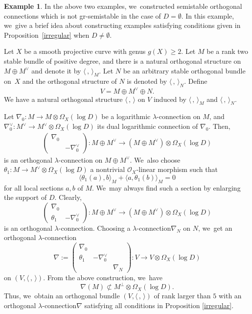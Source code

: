 \documentclass[11pt]{article}
\numberwithin{equation}{section}
\newcommand{\lconnection}{$\lambda$\nobreakdash-con\-nec\-tion\xspace}
\newcommand{\grsemistable}{gr\nobreakdash-semi\-stable\xspace}
\theoremstyle{plain}
\theoremstyle{definition}
\newtheorem{examp}[thm]{Example}
\begin{document}
\begin{examp}\label{exmp_idea}
In the above two examples, we~constructed semistable orthogonal connections which is not \grsemistable in the case of $D=\emptyset$. In this example, we~give a brief idea about constructing examples satisfying conditions given in Proposition~\ref{irregular} when $D\neq\emptyset$.

Let $X$ be a smooth projective curve with genus $g(X) \geq 2$. Let $M$ be a rank two stable bundle of positive degree, and there is a natural orthogonal structure on $M \oplus M^{\vee}$ and denote it by $\langle \,, \, \rangle_M$. Let $N$ be an arbitrary stable orthogonal bundle on~$X$ and the orthogonal structure of $N$ is denoted by $\langle \,, \, \rangle_N$. Define
\[
V=M\oplus M^\vee\oplus N.
\]
We have a natural orthogonal structure $\langle \,, \, \rangle$ on $V$ induced by $\langle \,, \, \rangle_M$ and $\langle \,, \, \rangle_N$.

Let $\nabla_0: M\to M\otimes\Omega_X(\log D)$ be a logarithmic \lconnection on $M$, and $\nabla_0^\vee: M^\vee \to M^\vee \otimes \Omega_X(\log D)$ its dual logarithmic connection of $\nabla_0$. Then,
\begin{align*}
\begin{pmatrix}
\nabla_0 & \\
& -\nabla^\vee_0
\end{pmatrix}: M \oplus M^\vee \to (M \oplus M^\vee) \otimes \Omega_X(\log D)
\end{align*}
is an orthogonal \lconnection on $M \oplus M^\vee$. We~also choose $\theta_1: M \to M^\vee \otimes \Omega_X(\log D)$ a nontrivial $\mathcal{O}_X$-linear morphism such that
\[
\langle \theta_1(a),b \rangle_M + \langle a,\theta_1(b) \rangle_M = 0
\]
for all local sections $a,b$ of $M$. We~may always find such a section by enlarging the support of $D$. Clearly,
\[
\begin{pmatrix}
\nabla_0 & \\
\theta_1 & -\nabla^\vee_0
\end{pmatrix}: M \oplus M^\vee \to (M \oplus M^\vee) \otimes \Omega_X(\log D)
\]
is an orthogonal \lconnection. Choosing a \lconnection $\nabla_N$ on $N$, we~get an orthogonal \lconnection
\[
\nabla:=
\begin{pmatrix}
\nabla_0 & & \\
\theta_1 & -\nabla^\vee_0 & \\
& & \nabla_N
\end{pmatrix}: V \to V \otimes \Omega_X(\log D)
\]
on $(V, \langle \,, \, \rangle)$. From the above construction, we~have
\[
\nabla(M)\not\subset M^\perp\otimes\Omega_X(\log D).
\]
Thus, we~obtain an orthogonal bundle $(V, \langle \,, \, \rangle)$ of rank larger than $5$ with an orthogonal \lconnection $\nabla$ satisfying all conditions in Proposition \ref{irregular}.
\end{examp}
\end{document}
